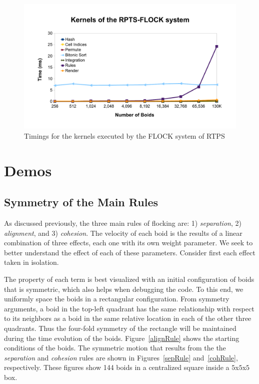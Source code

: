 \begin{figure}[htbp]
\begin{center}
\includegraphics[scale=0.7]{figures/kernelsPlot.pdf}
\caption{Timings for the kernels executed by the FLOCK system of RTPS}
\label{kernelBench}
\end{center}
\end{figure}


\section{Demos}

\subsection{Symmetry of the Main Rules}
As discussed previously, the three main rules of flocking are: 1) \textit{separation}, 2) \textit{alignment}, and 3) \textit{cohesion}. The velocity of each boid is the results of a linear combination of three effects, each one with its own weight parameter. We seek to better understand the effect of each of these parameters. Consider first each effect taken in isolation.

The property of each term is best visualized with an initial configuration of boids that is symmetric, which also helps when debugging the code. To this end, we uniformly space the boids in a rectangular configuration.  From symmetry arguments, a boid in the top-left quadrant has the same relationship with respect to its neighbors as a boid in the same relative location in each of the other three quadrants. Thus the four-fold symmetry of the rectangle will be maintained during the time evolution of the boids. Figure~\ref{alignRule} shows the starting conditions of the boids. The symmetric motion that results from the the \textit{separation} and \textit{cohesion} rules are shown in Figures~\ref{sepRule} and~\ref{cohRule}, respectively. These figures show 144 boids in a centralized square inside a $5$x$5$x$5$ box.

